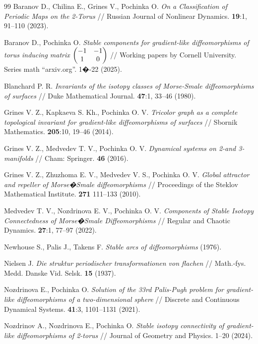 \documentclass{amsart}
\numberwithin{equation}{section}
\begin{document}
	\begin{thebibliography}{99}
		 Baranov D., Chilina E., Grines V.,  Pochinka O.  {\it On a Classification of Periodic Maps on the 2-Torus} // Russian Journal of Nonlinear Dynamics. {\bf 19}:1, 91--110 (2023).
		
		 Baranov D., Pochinka O. {\it Stable components for gradient-like diffeomorphisms of torus inducing matrix $\begin{pmatrix} -1 & -1\cr 1& 0\end{pmatrix}$ }// Working papers by Cornell University. Series math ``arxiv.org''. 1�-22 (2025).		
		
		 Blanchard P. R. {\it Invariants of the  isotopy classes of Morse-Smale diffeomorphisms of surfaces} // Duke Mathematical Journal. {\bf 47}:1,   33--46 (1980).
		
		 Grines V. Z., Kapkaeva S. Kh., Pochinka O. V. {\it Tricolor graph as a complete topological invariant for gradient-like diffeomorphisms of surfaces} // Sbornik Mathematics. {\bf 205}:10, 19--46 (2014).
		
		 	Grines V. Z., Medvedev T. V., Pochinka O. V. {\it Dynamical systems on 2-and 3-manifolds} // Cham: Springer. {\bf 46} (2016). 
		
		 Grines V. Z., Zhuzhoma E. V., Medvedev V. S., Pochinka O. V. {\it Global attractor and repeller of Morse�Smale diffeomorphisms} // Proceedings of the Steklov Mathematical Institute. {\bf 271} 111--133 (2010).	
		
		 Medvedev T. V., Nozdrinova E. V., Pochinka O. V. {\it Components of Stable Isotopy Connectedness of Morse�Smale Diffeomorphisms} // Regular and Chaotic Dynamics. {\bf 27}:1, 77--97 (2022).
		
		 Newhouse S., Palis J., Takens F. {\it Stable arcs of diffeomorphisms} (1976). 
		
		  Nielsen J. {\it Die struktur periodischer transformationen von flachen} // Math.-fys. Medd. Danske Vid. Selsk. {\bf 15} (1937).
		
		 Nozdrinova E., Pochinka O. {\it Solution of the 33rd Palis-Pugh problem for gradient-like diffeomorphisms of a two-dimensional sphere} // Discrete and Continuous Dynamical Systems. {\bf 41}:3, 1101--1131 (2021).
		
		  Nozdrinov A., Nozdrinova E., Pochinka O. {\it Stable isotopy connectivity of gradient-like diffeomorphisms of 2-torus} // Journal of Geometry and Physics. 1--20 (2024). 
		

\end{thebibliography}
\end{document}
